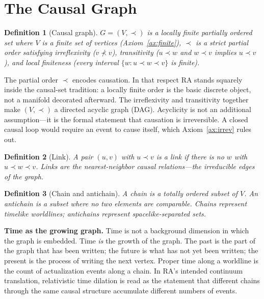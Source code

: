 \documentclass[11pt]{article}
\newtheorem{definition}{Definition}
\begin{document}
\section{The Causal Graph}
\label{sec:graph}

\begin{definition}[Causal graph]
$G=(V,\prec)$ is a locally finite partially ordered set where $V$ is a finite set of vertices (Axiom~\ref{ax:finite}), $\prec$ is a strict partial order satisfying irreflexivity ($v\not\prec v$), transitivity ($u\prec w$ and $w\prec v$ implies $u\prec v$), and local finiteness (every interval $\{w:u\prec w\prec v\}$ is finite).
\end{definition}

The partial order $\prec$ encodes causation. In that respect RA stands squarely inside the causal-set tradition: a locally finite order is the basic discrete object, not a manifold decorated afterward. The irreflexivity and transitivity together make $(V,\prec)$ a directed acyclic graph (DAG). Acyclicity is not an additional assumption---it is the formal statement that causation is irreversible. A closed causal loop would require an event to cause itself, which Axiom~\ref{ax:irrev} rules out.

\begin{definition}[Link]
A pair $(u,v)$ with $u\prec v$ is a \emph{link} if there is no $w$ with $u\prec w\prec v$. Links are the nearest-neighbor causal relations---the irreducible edges of the graph.
\end{definition}

\begin{definition}[Chain and antichain]
A \emph{chain} is a totally ordered subset of $V$. An \emph{antichain} is a subset where no two elements are comparable. Chains represent timelike worldlines; antichains represent spacelike-separated sets.
\end{definition}

\textbf{Time as the growing graph.} Time is not a background dimension in which the graph is embedded. Time \emph{is} the growth of the graph. The past is the part of the graph that has been written; the future is what has not yet been written; the present is the process of writing the next vertex. Proper time along a worldline is the count of actualization events along a chain. In RA's intended continuum translation, relativistic time dilation is read as the statement that different chains through the same causal structure accumulate different numbers of events.
\end{document}
